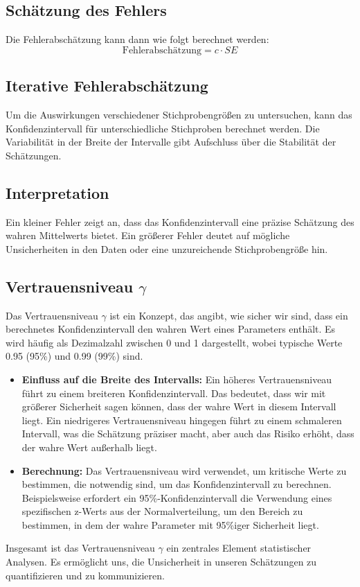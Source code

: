 \subsection*{Schätzung des Fehlers}
Die Fehlerabschätzung kann dann wie folgt berechnet werden:
\[
\text{Fehlerabschätzung} = c \cdot SE
\]

\subsection*{Iterative Fehlerabschätzung}
Um die Auswirkungen verschiedener Stichprobengrößen zu untersuchen, kann das Konfidenzintervall für unterschiedliche Stichproben berechnet werden. Die Variabilität in der Breite der Intervalle gibt Aufschluss über die Stabilität der Schätzungen.

\subsection*{Interpretation}
Ein kleiner Fehler zeigt an, dass das Konfidenzintervall eine präzise Schätzung des wahren Mittelwerts bietet. Ein größerer Fehler deutet auf mögliche Unsicherheiten in den Daten oder eine unzureichende Stichprobengröße hin.


\subsection{Vertrauensniveau $\gamma$}
\label{sec:vertrauensniveau}
Das Vertrauensniveau \(\gamma\) ist ein Konzept, das angibt, wie sicher wir sind, dass ein berechnetes Konfidenzintervall den wahren Wert eines Parameters enthält. Es wird häufig als Dezimalzahl zwischen 0 und 1 dargestellt, wobei typische Werte 0.95 (95\%) und 0.99 (99\%) sind.

\begin{itemize}
    \item \textbf{Einfluss auf die Breite des Intervalls:} Ein höheres Vertrauensniveau führt zu einem breiteren Konfidenzintervall. Das bedeutet, dass wir mit größerer Sicherheit sagen können, dass der wahre Wert in diesem Intervall liegt. Ein niedrigeres Vertrauensniveau hingegen führt zu einem schmaleren Intervall, was die Schätzung präziser macht, aber auch das Risiko erhöht, dass der wahre Wert außerhalb liegt.
    
    \item \textbf{Berechnung:} Das Vertrauensniveau wird verwendet, um kritische Werte zu bestimmen, die notwendig sind, um das Konfidenzintervall zu berechnen. Beispielsweise erfordert ein 95\%-Konfidenzintervall die Verwendung eines spezifischen z-Werts aus der Normalverteilung, um den Bereich zu bestimmen, in dem der wahre Parameter mit 95\%iger Sicherheit liegt.
\end{itemize}
Insgesamt ist das Vertrauensniveau \(\gamma\) ein zentrales Element statistischer Analysen. Es ermöglicht uns, die Unsicherheit in unseren Schätzungen zu quantifizieren und zu kommunizieren.
